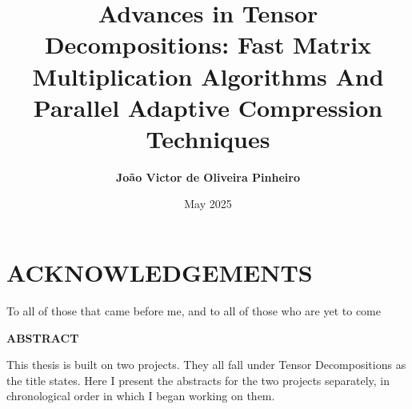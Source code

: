 \documentclass[MS]{wfuthesis}
\title{\textbf{Advances in Tensor Decompositions: Fast Matrix Multiplication Algorithms And Parallel Adaptive Compression Techniques}}
\author{\textbf{João Victor de Oliveira Pinheiro}}
\date{May 2025}
\begin{document}
    \maketitle
    \section*{\textbf{ACKNOWLEDGEMENTS}} To all of those that came before me, and to all of those who are yet to come





    \tableofcontents
    \newpage




    \listoffigures
    \newpage





    \printnomenclature
    \newpage






    \begin{center}
        \textbf{ABSTRACT}
    \end{center}
    This thesis is built on two projects. They all fall under Tensor
    Decompositions as the title states. Here I present the abstracts for the two
    projects separately, in chronological order in which I began working on
    them.
\end{document}
